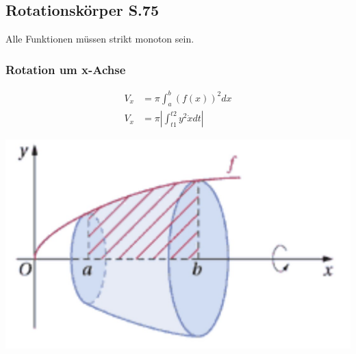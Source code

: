 \subsection{Rotationskörper \texorpdfstring{\hfill S.75}{S.75}}
Alle Funktionen müssen strikt monoton sein. 
\subsubsection{Rotation um x-Achse}
    \begin{minipage}{0.5\linewidth}
        \begin{align*}
            V_x &= \pi \int_a^b (f(x))^2 dx \\
            V_x &= \pi \left\lvert \int_{t1}^{t2} y^2 \dot{x} dt \right\lvert   
        \end{align*}
    \end{minipage}
\begin{minipage}{0.49\linewidth}
    \includegraphics[width=\linewidth]{src/Mehrdimensionale-Funktionen_Integralrechnung/x_Achsen_Rotation.jpg}
\end{minipage}

